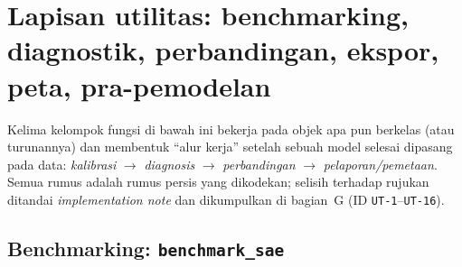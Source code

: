 \section{Lapisan utilitas: benchmarking, diagnostik, perbandingan, ekspor, peta, pra-pemodelan}\label{sec:utilitas}

Kelima kelompok fungsi di bawah ini bekerja pada objek apa pun berkelas
 (atau turunannya) dan membentuk ``alur kerja'' setelah sebuah
model selesai dipasang pada data: \emph{kalibrasi} $\to$ \emph{diagnosis}
$\to$ \emph{perbandingan} $\to$ \emph{pelaporan/pemetaan}. Semua
rumus adalah rumus persis yang dikodekan; selisih terhadap rujukan ditandai
\emph{implementation note} dan dikumpulkan di 
bagian~G (ID \texttt{UT-1}--\texttt{UT-16}).

\subsection{Benchmarking: \texttt{benchmark\_sae}}\label{sec:bm-sae}

